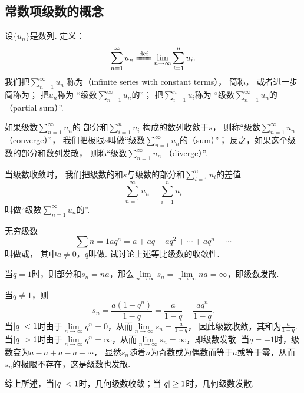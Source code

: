 \subsection{常数项级数的概念}
\begin{definition}\label{definition:无穷级数.常数项级数的定义}
设\(\{u_n\}\)是数列.
定义：\[
	\sum\limits_{n=1}^\infty u_n
	\defeq
	\lim\limits_{n\to\infty} \sum\limits_{i=1}^n u_i.
\]
我们把\(\sum\limits_{n=1}^\infty u_n\)
称为（infinite series with constant terms），
简称，
或者进一步简称为；
把\(u_n\)称为
“级数\(\sum\limits_{n=1}^\infty u_n\)的”；
把\(\sum\limits_{i=1}^n u_i\)称为
“级数\(\sum\limits_{n=1}^\infty u_n\)的（partial sum）”.

如果级数\(\sum\limits_{n=1}^\infty u_n\)的
部分和\(\sum\limits_{i=1}^n u_i\)
构成的数列收敛于\(s\)，
则称“级数\(\sum\limits_{n=1}^\infty u_n\) （converge）”，
我们把极限\(s\)叫做“级数\(\sum\limits_{n=1}^\infty u_n\)的（sum）”；
反之，如果这个级数的部分和数列发散，
则称“级数\(\sum\limits_{n=1}^\infty u_n\) （diverge）”.

当级数收敛时，
我们把级数的和\(s\)与级数的部分和\(\sum\limits_{i=1}^n u_i\)的差值\[
	\sum\limits_{n=1}^\infty u_n - \sum\limits_{i=1}^n u_i
\]
叫做“级数\(\sum\limits_{n=1}^\infty u_n\)的”.
\end{definition}

\begin{example}\label{example:无穷级数.等比级数的收敛性}
无穷级数\[
	\sum\limits{n=1} a q^n
	= a+aq+aq^2+\dotsb+aq^n+\dotsb
\]
叫做或，
其中\(a \neq 0\)，\(q\)叫做.
试讨论上述等比级数的收敛性.
\begin{solution}
当\(q = 1\)时，则部分和\(s_n=na\)，那么\(\lim\limits_{n\to\infty} s_n = \lim\limits_{n\to\infty} na = \infty\)，即级数发散.

当\(q \neq 1\)，则\[
s_n = \frac{a(1-q^n)}{1-q} = \frac{a}{1-q} - \frac{aq^n}{1-q}.
\]
当\(\abs{q} < 1\)时由于\(\lim\limits_{n\to\infty} q^n=0\)，从而\(\lim\limits_{n\to\infty} s_n=\frac{a}{1-q}\)，
因此级数收敛，其和为\(\frac{a}{1-q}\).
当\(\abs{q} > 1\)时由于\(\lim\limits_{n\to\infty} q^n=\infty\)，从而\(\lim\limits_{n\to\infty} s_n=\infty\)，即级数发散.
当\(q = -1\)时，级数变为\(a-a+a-a+\dotsb\)，
显然\(s_n\)随着\(n\)为奇数或为偶数而等于\(a\)或等于零，从而\(s_n\)的极限不存在，这是级数也发散.

综上所述，{\color{red}当\(\abs{q} < 1\)时，几何级数收敛；当\(\abs{q} \geq 1\)时，几何级数发散.}
\end{solution}
\end{example}

